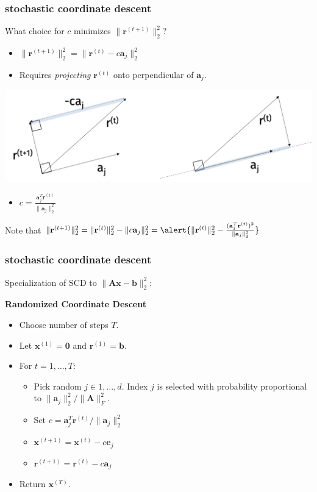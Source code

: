 \documentclass[compress]{beamer}
\newcommand{\bv}[1]{\mathbf{#1}}
\begin{document}
\begin{frame}[t]
	\frametitle{stochastic coordinate descent}
	\begin{center}
		What choice for $c$ minimizes $\|\bv{r}^{(t+1)}\|_2^2$?
	\end{center}

\begin{itemize}
	\item $\|\bv{r}^{(t+1)}\|_2^2 = \|\bv{r}^{(t)} - c\bv{a}_j\|_2^2$
	\item Requires \emph{projecting} $\bv{r}^{(t)}$ onto perpendicular of $\bv{a}_j$.
\end{itemize}
\vspace{-1em}
\begin{center}
	\includegraphics[width=.8\textwidth]{projection.png}
\end{center}
	\begin{itemize}
		\item $c = \frac{\bv{a}_j^T\bv{r}^{(t)}}{\|\bv{a}_j\|_2^2}$
	\end{itemize}

Note that $\|\bv{r}^{(t+1)}\|_2^2 = \|\bv{r}^{(t)}\|_2^2 - \|c\bv{a}_j\|_2^2 = \alert{\|\bv{r}^{(t)}\|_2^2 - \frac{(\bv{a}_j^T\bv{r}^{(t)})^2}{\|\bv{a}_j\|_2^2}}$
\end{frame}


\begin{frame}[t]
	\frametitle{stochastic coordinate descent}
	Specialization of SCD to $\|\bv{A}\bv{x} - \bv{b}\|_2^2$:
	\vspace{1em}
	
	\textbf{Randomized Coordinate Descent}
	\begin{itemize}
		\item Choose number of steps $T$. 
		\item Let $\bv{x}^{(1)} = \bv{0}$ and  $\bv{r}^{(1)} = \bv{b}$.
		\item For $t = 1,\ldots, T$:
		\begin{itemize}
			\item Pick random $j \in 1, \ldots, d$. Index $j$ is selected with probability proportional to $\|\bv{a}_j\|_2^2/\|\bv{A}\|_F^2$.
			\item Set $c = \bv{a}_j^T\bv{r}^{(t)}/\|\bv{a}_j\|_2^2$
			\item $\bv{x}^{(t+1)} = \bv{x}^{(t)} - c \bv{e}_j$
			\item $\bv{r}^{(t+1)} = \bv{r}^{(t)} - c \bv{a}_j$
		\end{itemize}
		\item Return ${\bv{x}^{(T)}}$.
	\end{itemize}
\end{frame}
\end{document}
